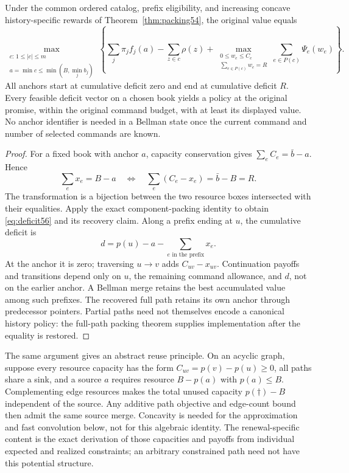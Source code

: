 \begin{theorem}\label{thm:deficit56}
Under the common ordered catalog, prefix eligibility, and increasing concave history-specific rewards of Theorem~\ref{thm:packing54}, the original value equals
\begin{equation}\label{eq:deficit56}
 \max_{\substack{c:\,1\leq |c|\leq m\\a=\min c\leq\min(B,\min_j b_j)}}
 \left\{\sum_j\pi_j f_j(a)-\sum_{z\in c}\rho(z)
 +\max_{\substack{0\leq w_e\leq C_e\\\sum_{e\in P(c)}w_e=R}}
           \sum_{e\in P(c)}\Psi_e(w_e)\right\}.
\end{equation}
All anchors start at cumulative deficit zero and end at cumulative deficit $R$. Every feasible deficit vector on a chosen book yields a policy at the original promise, within the original command budget, with at least its displayed value. No anchor identifier is needed in a Bellman state once the current command and number of selected commands are known.
\end{theorem}
\begin{proof}
For a fixed book with anchor $a$, capacity conservation gives $\sum_e C_e=\bar b-a$. Hence
\[
 \sum_e x_e=B-a\quad\Longleftrightarrow\quad
 \sum_e(C_e-x_e)=\bar b-B=R.
\]
The transformation is a bijection between the two resource boxes intersected with their equalities. Apply the exact component-packing identity to obtain \eqref{eq:deficit56} and its recovery claim. Along a prefix ending at $u$, the cumulative deficit is
\[
 d=p(u)-a-\sum_{e\text{ in the prefix}}x_e.
\]
At the anchor it is zero; traversing $u\to v$ adds $C_{uv}-x_{uv}$. Continuation payoffs and transitions depend only on $u$, the remaining command allowance, and $d$, not on the earlier anchor. A Bellman merge retains the best accumulated value among such prefixes. The recovered full path retains its own anchor through predecessor pointers. Partial paths need not themselves encode a canonical history policy: the full-path packing theorem supplies implementation after the equality is restored.
\end{proof}

The same argument gives an abstract reuse principle. On an acyclic graph, suppose every resource capacity has the form $C_{uv}=p(v)-p(u)\geq0$, all paths share a sink, and a source $a$ requires resource $B-p(a)$ with $p(a)\leq B$. Complementing edge resources makes the total unused capacity $p(\dagger)-B$ independent of the source. Any additive path objective and edge-count bound then admit the same source merge. Concavity is needed for the approximation and fast convolution below, not for this algebraic identity. The renewal-specific content is the exact derivation of those capacities and payoffs from individual expected and realized constraints; an arbitrary constrained path need not have this potential structure.

